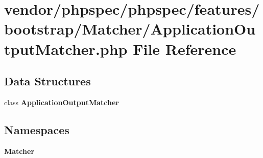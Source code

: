\section{vendor/phpspec/phpspec/features/bootstrap/\+Matcher/\+Application\+Output\+Matcher.php File Reference}
\label{_application_output_matcher_8php}
\subsection*{Data Structures}
\begin{DoxyCompactItemize}
\item 
class {\bf Application\+Output\+Matcher}
\end{DoxyCompactItemize}
\subsection*{Namespaces}
\begin{DoxyCompactItemize}
\item 
 {\bf Matcher}
\end{DoxyCompactItemize}
